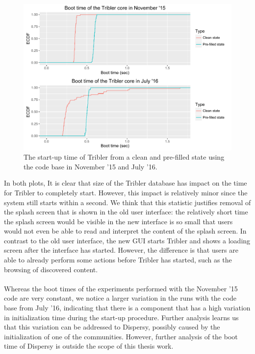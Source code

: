 \begin{figure}[!h]
	\centering
	\includegraphics[width=1.0\columnwidth]{images/experiments/startup}
	\caption{The start-up time of Tribler from a clean and pre-filled state using the code base in November '15 and July '16.}
	\label{fig:startup_experiment}
\end{figure}

In both plots, It is clear that size of the Tribler database has impact on the time for Tribler to completely start. However, this impact is relatively minor since the system still starts within a second. We think that this statistic justifies removal of the splash screen that is shown in the old user interface: the relatively short time the splash screen would be visible in the new interface is so small that users would not even be able to read and interpret the content of the splash screen. In contrast to the old user interface, the new GUI starts Tribler and shows a loading screen after the interface has started. However, the difference is that users are able to already perform some actions before Tribler has started, such as the browsing of discovered content.\\\\
Whereas the boot times of the experiments performed with the November '15 code are very constant, we notice a larger variation in the runs with the code base from July '16, indicating that there is a component that has a high variation in initialization time during the start-up procedure. Further analysis learns us that this variation can be addressed to Dispersy, possibly caused by the initialization of one of the communities. However, further analysis of the boot time of Dispersy is outside the scope of this thesis work.

